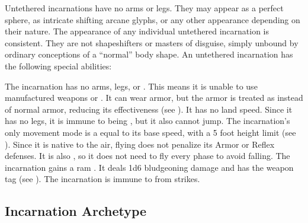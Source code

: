    Untethered incarnations have no arms or legs.
    They may appear as a perfect sphere, as intricate shifting arcane glyphs, or any other appearance depending on their nature.
    The appearance of any individual untethered incarnation is consistent.
    They are not shapeshifters or masters of disguise, simply unbound by ordinary conceptions of a ``normal'' body shape.
    An untethered incarnation has the following special abilities:
    \begin{raggeditemize}
         The incarnation has no arms, legs, or .
            This means it is unable to use manufactured weapons or .
            It can wear armor, but the armor is treated as  instead of normal armor, reducing its effectiveness (see ).
            It has no land speed.
            Since it has no legs, it is immune to being \prone, but it also cannot jump.
         The incarnation's only movement mode is a  equal to its base speed, with a 5 foot height limit (see ).
            Since it is native to the air, flying does not penalize its Armor or Reflex defenses.
            It is also , so it does not need to fly every phase to avoid falling.
         The incarnation gains a ram .
            It deals 1d6 bludgeoning damage and has the  weapon tag (see ).
         The incarnation is immune to  from strikes.
    \end{raggeditemize}

    \subsection{Incarnation Archetype}

